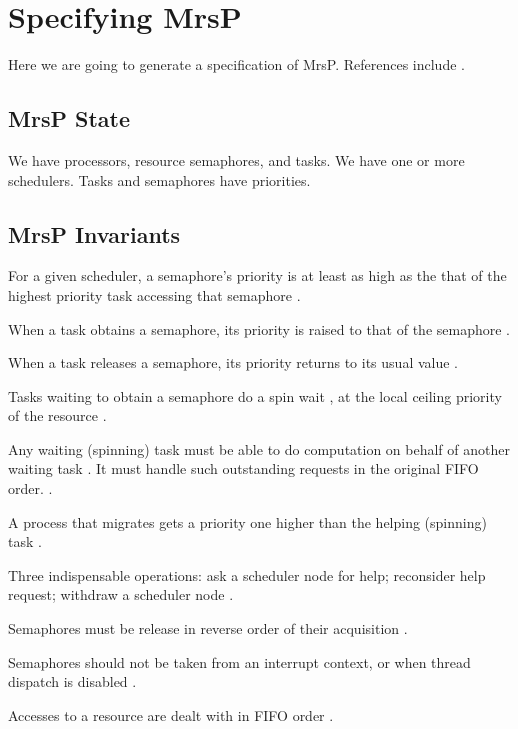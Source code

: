 \section{Specifying MrsP}\label{sec:MrsP}

Here we are going to generate a specification of MrsP.
References include
\cite{Bloom:2020:RTEMS}.

\subsection{MrsP State}

We have processors, resource semaphores, and tasks.
We have one or more schedulers.
Tasks and semaphores have priorities.

\subsection{MrsP Invariants}

For a given scheduler,
a semaphore's priority is at least as high
as the that of the highest priority task accessing that semaphore
\cite{Bloom:2020:RTEMS}.

When a task obtains a semaphore,
its priority is raised to that of the semaphore
\cite{Bloom:2020:RTEMS}.

When a task releases a semaphore, its priority returns to its usual value
\cite{Bloom:2020:RTEMS}.

Tasks waiting to obtain a semaphore do a spin wait
\cite{Bloom:2020:RTEMS},
at the local ceiling priority of the resource
\cite{Burns:2013:MrsP}.

Any waiting (spinning) task must be able to do computation
on behalf of another waiting task
\cite{Burns:2013:MrsP}.
It must handle such outstanding requests in the original FIFO order.
\cite{Burns:2013:MrsP}.

A process that migrates gets a priority one higher
than the helping (spinning) task
\cite{Burns:2013:MrsP}.

Three indispensable operations:
ask a scheduler node for help;
reconsider help request;
withdraw a scheduler node
\cite{Gomes:2019:MrsP}.

Semaphores must be release in reverse order of their acquisition
\cite{Bloom:2020:RTEMS}.

Semaphores should not be taken from an interrupt context,
or when thread dispatch is disabled
\cite{Bloom:2020:RTEMS}.

Accesses to a resource are dealt with in FIFO order
\cite{Burns:2013:MrsP}.

